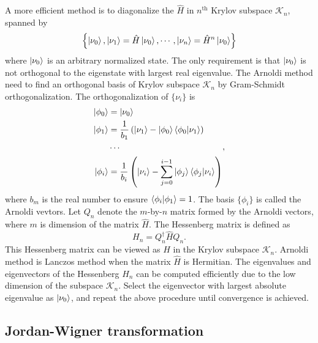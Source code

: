 \documentclass[longbibliography, aps, prx, amsmath, amssymb, amsfonts, twocolumn,superscriptaddress, footinbib]{revtex4-1}
\begin{document}
	A more efficient method is to diagonalize the $\hat{H}$ in $n^{\text{th}}$ Krylov subspace $\mathcal{K}_n$, spanned by
	\begin{equation}
		\left\{ \ket{\nu_0}, \ket{\nu_1}=\hat{H}\ket{\nu_0},\cdots,\ket{\nu_n}=\hat{H}^n\ket{\nu_0}\right\}
	\end{equation}
	where $\ket{\nu_0}$ is an arbitrary normalized state. The only requirement is that $\ket{\nu_0}$ is not orthogonal to the eigenstate with largest real eigenvalue. 
	The Arnoldi method need to find an orthogonal basis of Krylov subspace $\mathcal{K}_n$ by Gram-Schmidt orthogonalization. %
	The orthogonalization of $\{\nu_i\}$ is 
	\begin{equation}
		\begin{split}
			\ket{\phi_0} &= \ket{\nu_0}\\
			\ket{\phi_1} &= \frac{1}{b_1}\left(\ket{\nu_1} - \ket{\phi_0} \bra{\phi_0} \ket{\nu_1}\right)\\
			&\cdots\\
			\ket{\phi_i} &= \frac{1}{b_i}\left(\ket{\nu_i} - \sum_{j=0}^{i-1} \ket{\phi_j} \bra{\phi_j} \ket{\nu_i}\right)
		\end{split},			
	\end{equation}
	where $b_m$ is the real number to ensure $\bra{\phi_i}\ket{\phi_1}=1$. The basis $\{ \phi_i \}$ is called the Arnoldi vevtors. Let $Q_n$ denote the $m$-by-$n$ matrix formed by the Arnoldi vectors, where $m$ is dimension of the matrix $\hat{H}$. The Hessenberg matrix is defined as 
	\begin{equation}
		H_n = Q_n^{\dagger} \hat{H} Q_n.
	\end{equation}
	This Hessenberg matrix can be viewed as $\hat{H}$ in the Krylov subspace $\mathcal{K}_n$. 
	Arnoldi method is Lanczos method when the matrix $\hat{H}$ is Hermitian.
	The eigenvalues and eigenvectors of the Hessenberg $H_n$ can be computed efficiently due to the low dimension of the subspace $\mathcal{K}_n$. Select the eigenvector with largest absolute eigenvalue as $\ket{\nu_0}$, and repeat the above procedure until convergence is achieved.

	\subsection{Jordan-Wigner transformation}
\end{document}
